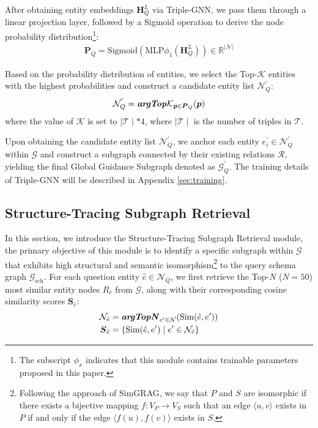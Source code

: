 \documentclass[11pt]{article}
\begin{document}
After obtaining entity embeddings $\mathbf{H}_Q^L$ via Triple-GNN, we pass them through a linear projection layer, followed by a Sigmoid operation to derive the node probability distribution\footnote{The subscript $\phi_x$
indicates that this module contains trainable parameters proposed in this paper.}:
\begin{align}
\boldsymbol{P}_Q = \mathrm{Sigmoid}(\text{MLP}{\phi_1}(\mathbf{H}_Q^L)) \in \mathbb{R}^{|\mathcal{N}|}
\end{align}

Based on the probability distribution of entities, we select the Top-$\mathcal{K}$ entities with the highest probabilities and construct a candidate entity list \( \mathcal{N}^{'}_Q \):
\begin{align}
\mathcal{N}^{'}_Q = \textbf{\textit{argTop}}\mathcal{K}_{\boldsymbol{p} \in \boldsymbol{P}_Q}(\boldsymbol{p})
\end{align}
where the value of $\mathcal{K}$ is set to $\mid\mathcal{T}\mid*4 $, where $\mid\mathcal{T}\mid$ is the number of triples in \( \mathcal{T} \). 

Upon obtaining the candidate entity list \( \mathcal{N}^{'}_Q \), we anchor each entity $e^{'}_i \in \mathcal{N}^{'}_Q$ within \( \mathcal{G} \) and construct a subgraph connected by their existing relations \( \mathcal{R} \), yielding the final Global Guidance Subgraph denoted as \( \mathcal{G}^{'}_Q \).
The training details of Triple-GNN will be described in Appendix \ref{sec:training}.

\subsection{Structure-Tracing Subgraph Retrieval}
\label{subsec:structure-tracing-subgraph-ret}
In this section, we introduce the Structure-Tracing Subgraph Retrieval module, the primary objective of this module is to identify a specific subgraph within $\mathcal{G}$ that exhibits high structural and semantic isomorphism\footnote{Following the approach of SimGRAG, we say that $P$ and $S$ are isomorphic if there exists a bijective mapping $f:V_P\to V_S$ such that an edge $\langle u, v \rangle$ exists in $P$ if and only if the edge $\langle f(u), f(v) \rangle$ exists in $S$.} \cite{cai2025simgrag} to the query schema graph $\mathcal{G}_{\text{sch}}$. For each question entity $\hat{e} \in \mathcal{N}_Q$, we first retrieve the Top-$N$ ($N=50$) most similar entity nodes $R_{\hat{e}}$ from $\mathcal{G}$, along with their corresponding cosine similarity scores $\boldsymbol{S}_{\hat{e}}$:
\begin{align}
\mathcal{N}_{\hat{e}} &= \textbf{\textit{argTopN}}_{e' \in \mathcal{N}}(\mathrm{Sim}(\hat{e}, e')) \\
\boldsymbol{S}_{\hat{e}} &= \{\mathrm{Sim}(\hat{e}, e') \mid e' \in \mathcal{N}_{\hat{e}}\}
\end{align}
\end{document}
